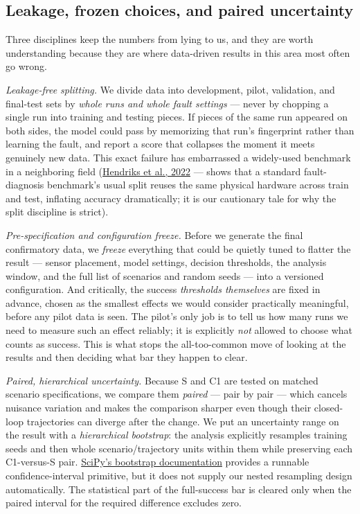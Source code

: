 \documentclass[12pt]{article}
\begin{document}
\subsection{Leakage, frozen choices, and paired uncertainty}

Three disciplines keep the numbers from lying to us, and they are worth understanding because they are where data-driven results in this area most often go wrong.

\emph{Leakage-free splitting.} We divide data into development, pilot, validation, and final-test sets by \emph{whole runs and whole fault settings} --- never by chopping a single run into training and testing pieces. If pieces of the same run appeared on both sides, the model could pass by memorizing that run's fingerprint rather than learning the fault, and report a score that collapses the moment it meets genuinely new data. This exact failure has embarrassed a widely-used benchmark in a neighboring field (\href{https://doi.org/10.1016/j.ymssp.2021.108732}{Hendriks et al., 2022} --- shows that a standard fault-diagnosis benchmark's usual split reuses the same physical hardware across train and test, inflating accuracy dramatically; it is our cautionary tale for why the split discipline is strict).

\emph{Pre-specification and configuration freeze.} Before we generate the final confirmatory data, we \emph{freeze} everything that could be quietly tuned to flatter the result --- sensor placement, model settings, decision thresholds, the analysis window, and the full list of scenarios and random seeds --- into a versioned configuration. And critically, the success \emph{thresholds themselves} are fixed in advance, chosen as the smallest effects we would consider practically meaningful, before any pilot data is seen. The pilot's only job is to tell us how many runs we need to measure such an effect reliably; it is explicitly \emph{not} allowed to choose what counts as success. This is what stops the all-too-common move of looking at the results and then deciding what bar they happen to clear.

\emph{Paired, hierarchical uncertainty.} Because S and C1 are tested on matched scenario specifications, we compare them \emph{paired} --- pair by pair --- which cancels nuisance variation and makes the comparison sharper even though their closed-loop trajectories can diverge after the change. We put an uncertainty range on the result with a \emph{hierarchical bootstrap}: the analysis explicitly resamples training seeds and then whole scenario/trajectory units within them while preserving each C1-versus-S pair. \href{https://docs.scipy.org/doc/scipy/reference/generated/scipy.stats.bootstrap.html}{SciPy's bootstrap documentation} provides a runnable confidence-interval primitive, but it does not supply our nested resampling design automatically. The statistical part of the full-success bar is cleared only when the paired interval for the required difference excludes zero.
\end{document}
